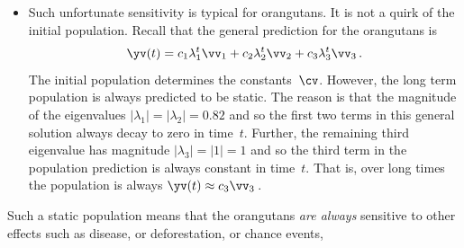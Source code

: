 \begin{example}
\begin{solution}
\begin{itemize}
\item Such unfortunate sensitivity is typical for orangutans.  
It is not a quirk of the initial population.
Recall that the general prediction for the orangutans is 
\begin{equation*}
\yv(t)=c_1\lambda_1^t\vv_1+c_2\lambda_2^t\vv_2+c_3\lambda_3^t\vv_3\,.
\end{equation*}
The initial population determines the constants~\(\cv\).
However, the long term population is always predicted to be static.
The reason is that the magnitude of the eigenvalues \(|\lambda_1|=|\lambda_2|=0.82\) and so the first two terms in this general solution always decay to zero in time~\(t\).
Further, the remaining third eigenvalue has magnitude \(|\lambda_3|=|1|=1\) and so the third term in the population prediction is always constant in time~\(t\).
That is, over long times the population is always
\(\yv(t)\approx c_3\vv_3\)\,.
\end{itemize}
Such a static population means that the orangutans \emph{are always} sensitive to other effects such as disease, or deforestation, or chance events, 
\end{solution}
\end{example}






